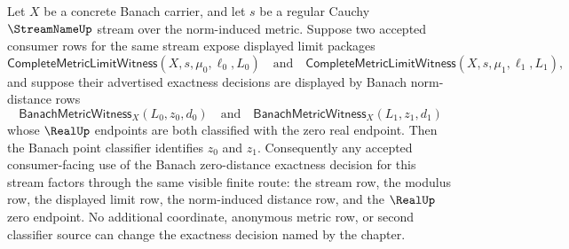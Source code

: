 \begin{corollary}
\label{cor:banach-zero-distance-exactness-determinacy}
Let $X$ be a concrete Banach carrier, and let $s$ be a regular Cauchy
$\StreamNameUp$ stream over the norm-induced metric. Suppose two accepted
consumer rows for the same stream expose displayed limit packages
$$
\mathsf{CompleteMetricLimitWitness}(X,s,\mu_0,\ell_0,L_0)
\quad\text{and}\quad
\mathsf{CompleteMetricLimitWitness}(X,s,\mu_1,\ell_1,L_1),
$$
and suppose their advertised exactness decisions are displayed by Banach
norm-distance rows
$$
\mathsf{BanachMetricWitness}_X(L_0,z_0,d_0)
\quad\text{and}\quad
\mathsf{BanachMetricWitness}_X(L_1,z_1,d_1)
$$
whose $\RealUp$ endpoints are both classified with the zero real endpoint.
Then the Banach point classifier identifies $z_0$ and $z_1$. Consequently any
accepted consumer-facing use of the Banach zero-distance exactness decision for
this stream factors through the same visible finite route: the stream row, the
modulus row, the displayed limit row, the norm-induced distance row, and the
$\RealUp$ zero endpoint. No additional coordinate, anonymous metric row, or
second classifier source can change the exactness decision named by the
chapter.
\end{corollary}
